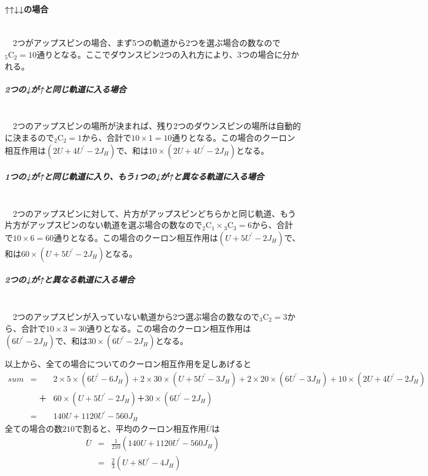 \documentclass{jsarticle}
\begin{document}
\paragraph{↑↑↓↓の場合}
\mbox{}\\
　2つがアップスピンの場合、まず5つの軌道から2つを選ぶ場合の数なので${}_{5} \mathrm{C} _ 2 = 10$通りとなる。ここでダウンスピン2つの入れ方により、3つの場合に分かれる。

\subparagraph{2つの↓が↑と同じ軌道に入る場合}
\mbox{}\\
　2つのアップスピンの場所が決まれば、残り2つのダウンスピンの場所は自動的に決まるので${}_{2} \mathrm{C} _ 2 = 1$から、合計で$10 \times 1 = 10$通りとなる。この場合のクーロン相互作用は$(2U + 4U^{\prime} - 2J_H)$で、和は$10 \times (2U + 4U^{\prime} - 2J_H)$となる。

\subparagraph{1つの↓が↑と同じ軌道に入り、もう1つの↓が↑と異なる軌道に入る場合}
\mbox{}\\
　2つのアップスピンに対して、片方がアップスピンどちらかと同じ軌道、もう片方がアップスピンのない軌道を選ぶ場合の数なので${}_{2} \mathrm{C} _ 1 \times {}_{3} \mathrm{C} _3 = 6$から、合計で$10 \times 6 = 60$通りとなる。この場合のクーロン相互作用は$(U + 5U^{\prime} - 2J_H)$で、和は$60 \times (U + 5U^{\prime} - 2J_H)$となる。

\subparagraph{2つの↓が↑と異なる軌道に入る場合}
\mbox{}\\
　2つのアップスピンが入っていない軌道から2つ選ぶ場合の数なので${}_{3} \mathrm{C} _ 2 = 3$から、合計で$10 \times 3 = 30$通りとなる。この場合のクーロン相互作用は$(6U^{\prime} - 2J_H)$で、和は$30 \times (6U^{\prime} - 2J_H)$となる。

\newpage

以上から、全ての場合についてのクーロン相互作用を足しあげると
\begin{eqnarray}
sum &=& 2 \times 5 \times (6U^{\prime} - 6J_H) + 2 \times 30 \times (U+5U^{\prime}-3J_H) + 2 \times 20 \times (6U^{\prime}-3J_H) + 10 \times (2U + 4U^{\prime} - 2J_H) \nonumber \\
&\quad＋& 60 \times (U + 5U^{\prime} - 2J_H) ＋ 30 \times (6U^{\prime} - 2J_H) \nonumber \\
&=&  140U + 1120U^{\prime} - 560J_H \nonumber
\end{eqnarray}
全ての場合の数$210$で割ると、平均のクーロン相互作用$\overline{U}$は
\begin{eqnarray}
\overline{U} &=& \frac{1}{210}(140U + 1120U^{\prime} - 560J_H) \nonumber \\
&=& \frac{2}{3} (U+8U^{\prime}-4J_H) \nonumber
\end{eqnarray}
\end{document}
